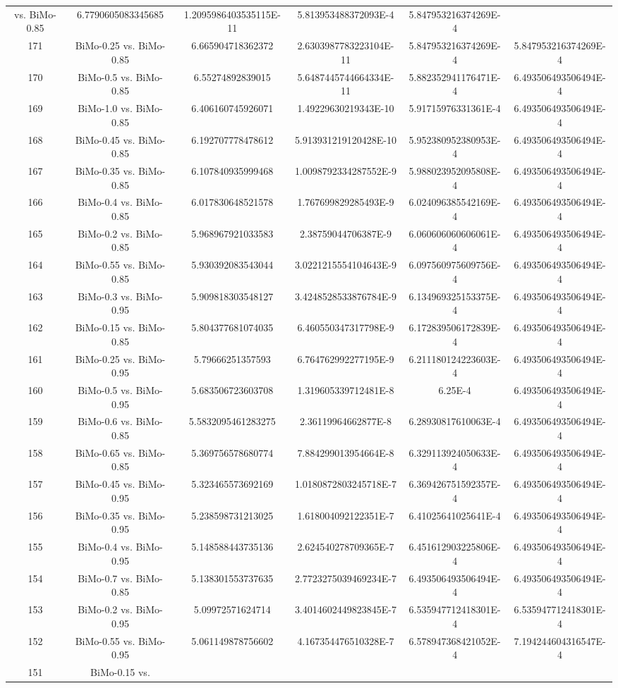 \documentclass[a4paper,10pt]{article}
\begin{document}
\begin{landscape}
\begin{table}[!htp]
\begin{tabular}{cccccc}
vs. BiMo-0.85&6.7790605083345685&1.2095986403535115E-11&5.813953488372093E-4&5.847953216374269E-4\\171&BiMo-0.25 vs. BiMo-0.85&6.665904718362372&2.6303987783223104E-11&5.847953216374269E-4&5.847953216374269E-4\\170&BiMo-0.5 vs. BiMo-0.85&6.55274892839015&5.6487445744664334E-11&5.882352941176471E-4&6.493506493506494E-4\\169&BiMo-1.0 vs. BiMo-0.85&6.406160745926071&1.49229630219343E-10&5.91715976331361E-4&6.493506493506494E-4\\168&BiMo-0.45 vs. BiMo-0.85&6.192707778478612&5.913931219120428E-10&5.952380952380953E-4&6.493506493506494E-4\\167&BiMo-0.35 vs. BiMo-0.85&6.107840935999468&1.0098792334287552E-9&5.988023952095808E-4&6.493506493506494E-4\\166&BiMo-0.4 vs. BiMo-0.85&6.017830648521578&1.767699829285493E-9&6.024096385542169E-4&6.493506493506494E-4\\165&BiMo-0.2 vs. BiMo-0.85&5.968967921033583&2.38759044706387E-9&6.060606060606061E-4&6.493506493506494E-4\\164&BiMo-0.55 vs. BiMo-0.85&5.930392083543044&3.0221215554104643E-9&6.097560975609756E-4&6.493506493506494E-4\\163&BiMo-0.3 vs. BiMo-0.95&5.909818303548127&3.4248528533876784E-9&6.134969325153375E-4&6.493506493506494E-4\\162&BiMo-0.15 vs. BiMo-0.85&5.804377681074035&6.460550347317798E-9&6.172839506172839E-4&6.493506493506494E-4\\161&BiMo-0.25 vs. BiMo-0.95&5.79666251357593&6.764762992277195E-9&6.211180124223603E-4&6.493506493506494E-4\\160&BiMo-0.5 vs. BiMo-0.95&5.683506723603708&1.319605339712481E-8&6.25E-4&6.493506493506494E-4\\159&BiMo-0.6 vs. BiMo-0.85&5.5832095461283275&2.36119964662877E-8&6.28930817610063E-4&6.493506493506494E-4\\158&BiMo-0.65 vs. BiMo-0.85&5.369756578680774&7.884299013954664E-8&6.329113924050633E-4&6.493506493506494E-4\\157&BiMo-0.45 vs. BiMo-0.95&5.323465573692169&1.0180872803245718E-7&6.369426751592357E-4&6.493506493506494E-4\\156&BiMo-0.35 vs. BiMo-0.95&5.238598731213025&1.618004092122351E-7&6.41025641025641E-4&6.493506493506494E-4\\155&BiMo-0.4 vs. BiMo-0.95&5.148588443735136&2.624540278709365E-7&6.451612903225806E-4&6.493506493506494E-4\\154&BiMo-0.7 vs. BiMo-0.85&5.138301553737635&2.7723275039469234E-7&6.493506493506494E-4&6.493506493506494E-4\\153&BiMo-0.2 vs. BiMo-0.95&5.09972571624714&3.4014602449823845E-7&6.535947712418301E-4&6.535947712418301E-4\\152&BiMo-0.55 vs. BiMo-0.95&5.061149878756602&4.167354476510328E-7&6.578947368421052E-4&7.194244604316547E-4\\151&BiMo-0.15 vs. 
\end{tabular}
\end{table}
\end{landscape}
\end{document}
